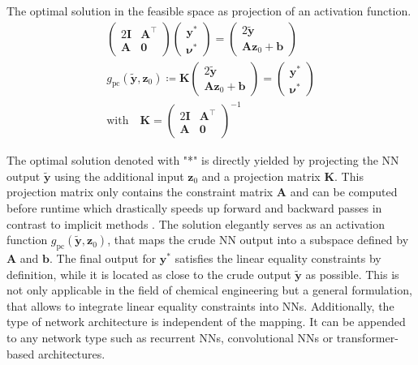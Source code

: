 \begin{corollary} The optimal solution in the feasible space as projection of an activation function.
    \label{cor: physics constrained solution}
    \begin{gather*}
    \begin{pmatrix}
        2 \bm{I} & \bm{A}^\top  \\
        \bm{A} & \bm{0}   
    \end{pmatrix} 
    \begin{pmatrix} \bm{y}^* \\ \bm{\nu}^* \end{pmatrix}
    = 
    \begin{pmatrix} 2 \bm{\tilde{y}} \\ \bm{A} \bm{z}_0 + \bm{b} \end{pmatrix}
    \\
    g_\text{pc}(\bm{\tilde{y}}, \bm{z}_0) \coloneq
    \bm{K} \begin{pmatrix} 2 \bm{\tilde{y}} \\ \bm{A} \bm{z}_0 + \bm{b} \end{pmatrix}
    = \begin{pmatrix} \bm{y}^* \\ \bm{\nu}^* \end{pmatrix}
    \\
    \mathrm{with} \quad \bm{K} = 
        \begin{pmatrix}
            2 \bm{I} & \bm{A}^\top  \\
            \bm{A} & \bm{0}   
        \end{pmatrix} ^{-1} 
    \end{gather*}
\end{corollary}
\noindent
The optimal solution denoted with "*" is directly yielded by projecting the NN output $\bm{\tilde{y}}$
using the additional input $\bm{z}_0$ and a projection matrix $\bm{K}$.
This projection matrix only contains the constraint matrix $\bm{A}$ and can be computed
before runtime which drastically speeds up forward and backward passes in contrast to implicit methods \cite{cvxpylayers2019}.
The solution elegantly serves as an 
activation function $g_\text{pc}(\bm{\tilde{y}}, \bm{z}_0)$, that maps the crude NN output into a subspace defined by $\bm{A}$ and $\bm{b}$. The final output
for $\bm{y}^*$ satisfies the linear equality constraints by definition, while it is located as close to the crude
output $\bm{\tilde{y}}$ as possible. 
This is not only applicable in the field of chemical engineering but a 
general formulation, that allows to integrate linear equality constraints into NNs.
Additionally, the type of network architecture is independent of the mapping. It can be appended to any 
network type such as recurrent NNs, convolutional NNs or transformer-based architectures.
\newline

